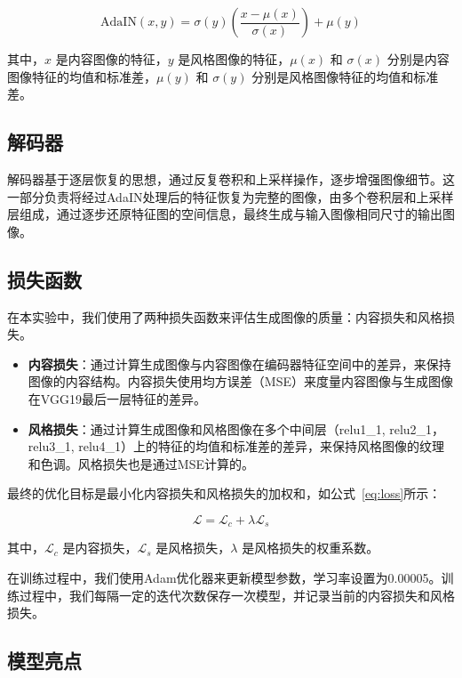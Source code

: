 \documentclass[UTF8,openany]{ctexbook}
\begin{document}
\begin{equation}
    \text{AdaIN}(x, y) = \sigma(y) \left( \frac{x - \mu(x)}{\sigma(x)} \right) + \mu(y)
    \label{eq:adain}
\end{equation}

其中，$x$ 是内容图像的特征，$y$ 是风格图像的特征，$\mu(x)$ 和 $\sigma(x)$ 分别是内容图像特征的均值和标准差，$\mu(y)$ 和 $\sigma(y)$ 分别是风格图像特征的均值和标准差。

\subsection{解码器}

解码器基于逐层恢复的思想，通过反复卷积和上采样操作，逐步增强图像细节。这一部分负责将经过AdaIN处理后的特征恢复为完整的图像，由多个卷积层和上采样层组成，通过逐步还原特征图的空间信息，最终生成与输入图像相同尺寸的输出图像。

\subsection{损失函数}

在本实验中，我们使用了两种损失函数来评估生成图像的质量：内容损失和风格损失。

\begin{itemize}[nosep]
    \item \textbf{内容损失}：通过计算生成图像与内容图像在编码器特征空间中的差异，来保持图像的内容结构。内容损失使用均方误差（MSE）来度量内容图像与生成图像在VGG19最后一层特征的差异。
    \item \textbf{风格损失}：通过计算生成图像和风格图像在多个中间层（relu1\_1, relu2\_1，relu3\_1, relu4\_1）上的特征的均值和标准差的差异，来保持风格图像的纹理和色调。风格损失也是通过MSE计算的。
\end{itemize}

最终的优化目标是最小化内容损失和风格损失的加权和，如公式~\ref{eq:loss}所示：

\begin{equation}
    \mathcal{L} = \mathcal{L}_c + \lambda \mathcal{L}_s
    \label{eq:loss}
\end{equation}

其中，$\mathcal{L}_c$ 是内容损失，$\mathcal{L}_s$ 是风格损失，$\lambda$ 是风格损失的权重系数。

在训练过程中，我们使用Adam优化器来更新模型参数，学习率设置为0.00005。训练过程中，我们每隔一定的迭代次数保存一次模型，并记录当前的内容损失和风格损失。

\subsection{模型亮点}
\end{document}
